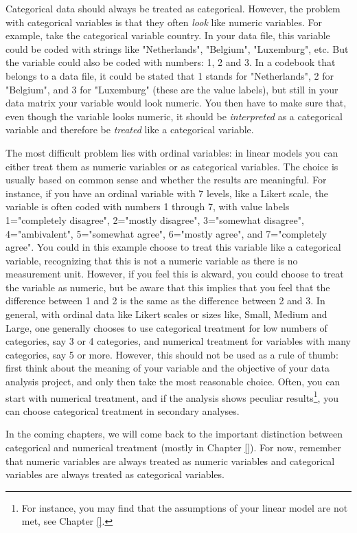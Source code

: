 \documentclass[]{report}\usepackage[]{graphicx}\usepackage[]{color}
\begin{document}
Categorical data should always be treated as categorical. However, the problem with categorical variables is that they often \textit{look} like numeric variables. For example, take the categorical variable country. In your data file, this variable could be coded with strings like "Netherlands", "Belgium", "Luxemburg", etc. But the variable could also be coded with numbers: 1, 2 and 3. In a codebook that belongs to a data file, it could be stated that 1 stands for "Netherlands", 2 for "Belgium", and 3 for "Luxemburg" (these are the value labels), but still in your data matrix your variable would look numeric. You then have to make sure that, even though the variable looks numeric, it should be \textit{interpreted} as a categorical variable and therefore be \textit{treated} like a categorical variable.

The most difficult problem lies with ordinal variables: in linear models you can either treat them as numeric variables or as categorical variables. The choice is usually based on common sense and whether the results are meaningful. For instance, if you have an ordinal variable with 7 levels, like a Likert scale, the variable is often coded with numbers 1 through 7, with value labels 1="completely disagree", 2="mostly disagree", 3="somewhat disagree", 4="ambivalent", 5="somewhat agree", 6="mostly agree", and 7="completely agree". You could in this example choose to treat this variable like a categorical variable, recognizing that this is not a numeric variable as there is no measurement unit. However, if you feel this is akward, you could choose to treat the variable as numeric, but be aware that this implies that you feel that the difference between 1 and 2 is the same as the difference between 2 and 3. In general, with ordinal data like Likert scales or sizes like, Small, Medium and Large, one generally chooses to use categorical treatment for low numbers of categories, say 3 or 4 categories, and numerical treatment for variables with many categories, say 5 or more. However, this should not be used as a rule of thumb: first think about the meaning of your variable and the objective of your data analysis project, and only then take the most reasonable choice. Often, you can start with numerical treatment, and if the analysis shows peculiar results\footnote{For instance, you may find that the assumptions of your linear model are not met, see Chapter \ref{}.}, you can choose categorical treatment in secondary analyses.

In the coming chapters, we will come back to the important distinction between categorical and numerical treatment (mostly in Chapter \ref{}). For now, remember that numeric variables are always treated as numeric variables and categorical variables are always treated as categorical variables.  
\end{document}
